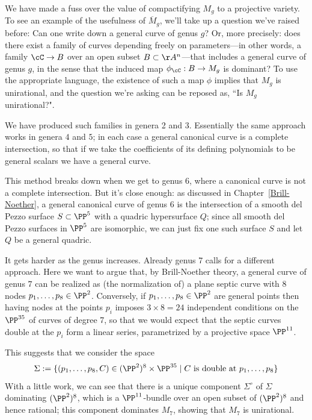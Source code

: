 We have made a fuss over the value of compactifying $M_g$ to a projective variety. To see an example of the usefulness of $\overline M_g$, we'll take up a question we've raised before: Can one write down a general curve of genus $g$?
Or, more precisely: does there exist  a family of curves depending freely on parameters---in other words, a family $\cC \to B$ over an open subset $B \subset \AA^n$---that includes a general curve of genus $g$, in the sense that the induced map $\phi_\cC : B \to M_g$ is dominant? To use the appropriate language, the existence of such a map $\phi$ implies that $M_g$ is unirational, and the question we're asking can be reposed as, ``Is $M_g$ unirational?". 	

We have produced such  families in genera 2 and 3. Essentially
the same approach works in genera $4$ and $5$; in each case a general canonical curve is a complete intersection, so that if we take the coefficients of its defining polynomials to be general scalars we have a general curve.

This method breaks down when we get to genus 6, where a canonical curve is not a complete intersection. But it's close enough: as discussed in Chapter~\ref{Brill-Noether}, a general canonical curve of genus 6 is the intersection of a smooth del Pezzo surface $S \subset \PP^5$ with a quadric hypersurface $Q$; since all smooth del Pezzo surfaces in $\PP^5$ are isomorphic, we can just fix one such surface $S$ and let $Q$ be a general quadric.

It gets harder as the genus increases. Already genus 7 calls for a different approach. Here we want to argue that, by Brill-Noether theory, a general curve of genus $7$ can be realized as (the normalization of) a plane septic curve with 8 nodes $p_1,\dots,p_8 \in \PP^2$. Conversely, if $p_1,\dots,p_8 \in \PP^2$ are general points then having nodes at the points $p_i$ imposes $ 3\times 8 = 24$ independent conditions on the $\PP^{35}$ of curves of degree 7, so that we would expect that the septic curves double at the $p_i$ form a linear series, parametrized by a projective space $\PP^{11}$.

This suggests that we consider the space
$$
\Sigma := \{ (p_1,\dots,p_8,C) \in (\PP^2)^8 \times \PP^{35} \mid C \text{ is double at } p_1,\dots,p_8 \}
$$
With a little work, we can see that there is a unique component $\Sigma^\circ$ of $\Sigma$ dominating $(\PP^2)^8$, which is a $\PP^{11}$-bundle over an open subset of $(\PP^2)^8$ and hence rational; this component dominates $M_7$, showing that $M_7$ is unirational.


